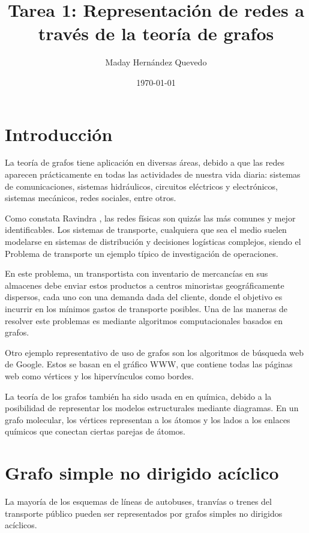 \documentclass{article}
\title{
Tarea 1: Representación de redes a través de la teoría de grafos
}
\author{Maday Hernández Quevedo}
\date{\today}
\begin{document}
\maketitle

\section*{Introducción}

La teoría de grafos tiene aplicación en diversas áreas, debido a que las redes aparecen prácticamente en todas las actividades de nuestra vida diaria: sistemas de comunicaciones, sistemas hidráulicos, circuitos eléctricos y electrónicos, sistemas mecánicos, redes sociales, entre otros. 

Como constata Ravindra \cite{ahuja2017network}, las redes físicas son quizás las más comunes y mejor identificables. Los sistemas de transporte, cualquiera que sea el medio suelen modelarse en sistemas de distribución  y decisiones logísticas complejos, siendo el Problema de transporte un ejemplo típico de investigación de operaciones. 

En este problema, un transportista con inventario de mercancías en sus almacenes debe enviar estos productos a centros minoristas geográficamente dispersos, cada uno con una demanda dada del cliente, donde el objetivo es incurrir en los mínimos gastos de transporte posibles. Una de las maneras de resolver este problemas es mediante algoritmos computacionales basados en grafos.

Otro ejemplo representativo de uso de grafos son los algoritmos de búsqueda web de Google. Estos se basan en el gráfico WWW, que contiene todas las páginas web como vértices y los  hipervínculos como bordes. \cite{chung2010graph}

La teoría de los grafos también ha sido usada en en química, debido a la posibilidad de representar los modelos estructurales mediante diagramas. En un grafo molecular, los vértices representan a los átomos y los lados a los enlaces químicos que conectan ciertas parejas de átomos. \cite{amador}

\section{Grafo simple no dirigido acíclico}

La mayoría de los esquemas de líneas de autobuses, tranvías o trenes del transporte público pueden ser representados por grafos simples no dirigidos acíclicos.
\end{document}
